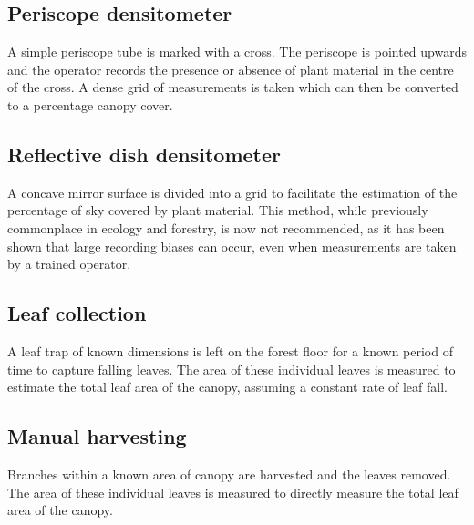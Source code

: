 \documentclass{article}
\begin{document}
\subsection{Periscope densitometer}

A simple periscope tube is marked with a cross. The periscope is pointed upwards and the operator records the presence or absence of plant material in the centre of the cross. A dense grid of measurements is taken which can then be converted to a percentage canopy cover.

\subsection{Reflective dish densitometer}

A concave mirror surface is divided into a grid to facilitate the estimation of the percentage of sky covered by plant material. This method, while previously commonplace in ecology and forestry, is now not recommended, as it has been shown that large recording biases can occur, even when measurements are taken by a trained operator.

\subsection{Leaf collection}

A leaf trap of known dimensions is left on the forest floor for a known period of time to capture falling leaves. The area of these individual leaves is measured to estimate the total leaf area of the canopy, assuming a constant rate of leaf fall.

\subsection{Manual harvesting}

Branches within a known area of canopy are harvested and the leaves removed. The area of these individual leaves is measured to directly measure the total leaf area of the canopy.


\end{document}
